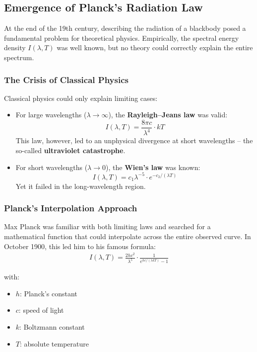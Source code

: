 \subsection{Emergence of Planck’s Radiation Law}

At the end of the 19th century, describing the radiation of a blackbody posed a fundamental problem for theoretical physics. Empirically, the spectral energy density \( I(\lambda, T) \) was well known, but no theory could correctly explain the entire spectrum.

\subsubsection{The Crisis of Classical Physics}

Classical physics could only explain limiting cases:

\begin{itemize}
	\item For large wavelengths (\(\lambda \to \infty\)), the \textbf{Rayleigh–Jeans law} was valid:
	\[
	I(\lambda, T) = \frac{8\pi c}{\lambda^4} \cdot kT
	\]
	This law, however, led to an unphysical divergence at short wavelengths – the so-called \textbf{ultraviolet catastrophe}.
	
	\item For short wavelengths (\(\lambda \to 0\)), the \textbf{Wien’s law} was known:
	\[
	I(\lambda, T) = c_1 \lambda^{-5} \cdot e^{-c_2/(\lambda T)}
	\]
	Yet it failed in the long-wavelength region.
\end{itemize}

\subsubsection{Planck’s Interpolation Approach}

Max Planck was familiar with both limiting laws and searched for a mathematical function that could interpolate across the entire observed curve. In October 1900, this led him to his famous formula:
\begin{align}
	I(\lambda, T) = \frac{2hc^2}{\lambda^5} \cdot \frac{1}{e^{hc/(\lambda kT)} - 1}
\end{align}

with:
\begin{itemize}
	\item \( h \): Planck’s constant
	\item \( c \): speed of light
	\item \( k \): Boltzmann constant
	\item \( T \): absolute temperature
\end{itemize}

